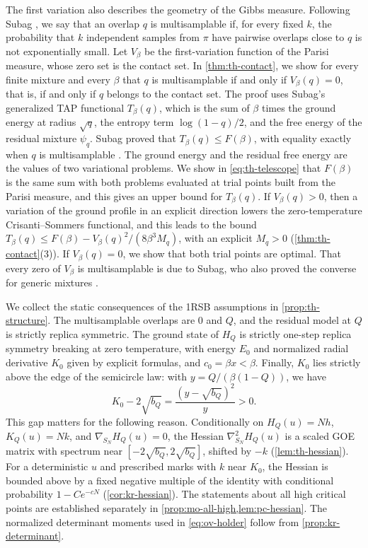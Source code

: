 The first variation also describes the geometry of the Gibbs measure. Following Subag \cite{Subag2024}, we say that an overlap $q$ is multisamplable if, for every fixed $k$, the probability that $k$ independent samples from $\pi$ have pairwise overlaps close to $q$ is not exponentially small. Let $V_\beta$ be the first-variation function of the Parisi measure, whose zero set is the contact set. In \cref{thm:th-contact}, we show for every finite mixture and every $\beta$ that $q$ is multisamplable if and only if $V_\beta(q)=0$, that is, if and only if $q$ belongs to the contact set. The proof uses Subag's generalized TAP functional $T_\beta(q)$, which is the sum of $\beta$ times the ground energy at radius $\sqrt q$, the entropy term $\log(1-q)/2$, and the free energy of the residual mixture $\psi_q$. Subag proved that $T_\beta(q)\le F(\beta)$, with equality exactly when $q$ is multisamplable \cite[Theorem~5]{Subag2024}. The ground energy and the residual free energy are the values of two variational problems. We show in \eqref{eq:th-telescope} that $F(\beta)$ is the same sum with both problems evaluated at trial points built from the Parisi measure, and this gives an upper bound for $T_\beta(q)$. If $V_\beta(q)>0$, then a variation of the ground profile in an explicit direction lowers the zero-temperature Crisanti--Sommers functional, and this leads to the bound $T_\beta(q)\le F(\beta)-V_\beta(q)^2/(8\beta^3M_q)$, with an explicit $M_q>0$ (\cref{thm:th-contact}(3)). If $V_\beta(q)=0$, we show that both trial points are optimal. That every zero of $V_\beta$ is multisamplable is due to Subag, who also proved the converse for generic mixtures \cite[Theorem~10]{Subag2024}.

We collect the static consequences of the 1RSB assumptions in \cref{prop:th-structure}. The multisamplable overlaps are $0$ and $Q$, and the residual model at $Q$ is strictly replica symmetric. The ground state of $H_Q$ is strictly one-step replica symmetry breaking at zero temperature, with energy $E_0$ and normalized radial derivative $K_0$ given by explicit formulas, and $c_0=\beta x<\beta$. Finally, $K_0$ lies strictly above the edge of the semicircle law: with $y=Q/(\beta(1-Q))$, we have
\begin{equation}\label{eq:ov-gap}
K_0-2\sqrt{b_Q}=\frac{(y-\sqrt{b_Q})^2}y>0.
\end{equation}
This gap matters for the following reason. Conditionally on $H_Q(u)=Nh$, $K_Q(u)=Nk$, and $\nabla_{S_N}H_Q(u)=0$, the Hessian $\nabla^2_{S_N}H_Q(u)$ is a scaled GOE matrix with spectrum near $[-2\sqrt{b_Q},2\sqrt{b_Q}]$, shifted by $-k$ (\cref{lem:th-hessian}). For a deterministic $u$ and prescribed marks with $k$ near $K_0$, the Hessian is bounded above by a fixed negative multiple of the identity with conditional probability $1-Ce^{-cN}$ (\cref{cor:kr-hessian}). The statements about all high critical points are established separately in \cref{prop:mo-all-high,lem:pc-hessian}. The normalized determinant moments used in \eqref{eq:ov-holder} follow from \cref{prop:kr-determinant}.

